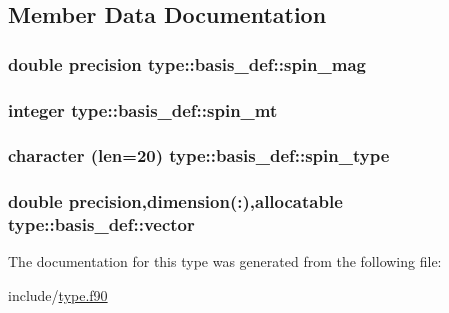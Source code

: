 \subsection{Member Data Documentation}
\hypertarget{typetype_1_1basis__def_a83ca561a604c3e055d4abe811a1106e0}{
\subsubsection[{spin\_\-mag}]{\setlength{\rightskip}{0pt plus 5cm}double precision {\bf type::basis\_\-def::spin\_\-mag}}}
\label{typetype_1_1basis__def_a83ca561a604c3e055d4abe811a1106e0}
\hypertarget{typetype_1_1basis__def_ae2f992ef5c95d356fc17c7fb3d2ddb05}{
\subsubsection[{spin\_\-mt}]{\setlength{\rightskip}{0pt plus 5cm}integer {\bf type::basis\_\-def::spin\_\-mt}}}
\label{typetype_1_1basis__def_ae2f992ef5c95d356fc17c7fb3d2ddb05}
\hypertarget{typetype_1_1basis__def_ac9df01c9bb86c48e83b703c5ff572bd4}{
\subsubsection[{spin\_\-type}]{\setlength{\rightskip}{0pt plus 5cm}character (len=20) {\bf type::basis\_\-def::spin\_\-type}}}
\label{typetype_1_1basis__def_ac9df01c9bb86c48e83b703c5ff572bd4}
\hypertarget{typetype_1_1basis__def_ad4d4c5c525a549e1d0970bf2ed2839ca}{
\subsubsection[{vector}]{\setlength{\rightskip}{0pt plus 5cm}double precision,dimension(:),allocatable {\bf type::basis\_\-def::vector}}}
\label{typetype_1_1basis__def_ad4d4c5c525a549e1d0970bf2ed2839ca}


The documentation for this type was generated from the following file:\begin{DoxyCompactItemize}
\item 
include/\hyperlink{type_8f90}{type.f90}\end{DoxyCompactItemize}
